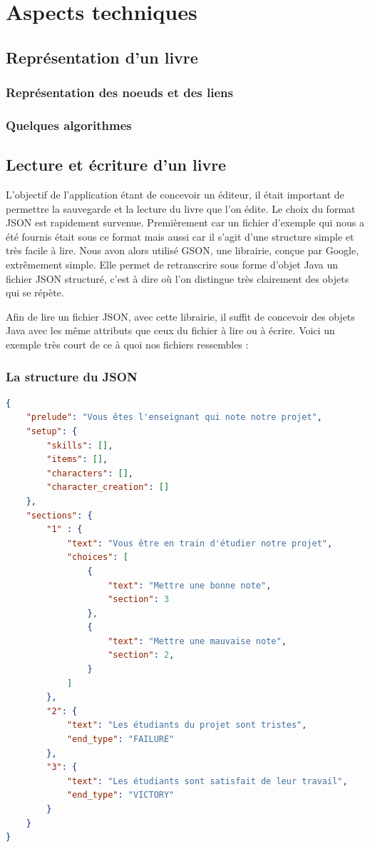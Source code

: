 \chapter{Aspects techniques}

	\section{Représentation d'un livre}
		\label{sec:representation_livre}

		\subsection{Représentation des noeuds et des liens}



		\subsection{Quelques algorithmes}



	\section{Lecture et écriture d'un livre}

		L'objectif de l'application étant de concevoir un éditeur, il était important de permettre la sauvegarde et la lecture du livre que l'on édite. Le choix du format JSON est rapidement survenue. Premièrement car un fichier d'exemple qui nous a été fournis était sous ce format mais aussi car il s'agit d'une structure simple et très facile à lire. Nous avon alors utilisé GSON, une librairie, conçue par Google, extrêmement simple. Elle permet de retranscrire sous forme d'objet Java un fichier JSON structuré, c'est à dire où l'on distingue très clairement des objets qui se répète.

		Afin de lire un fichier JSON, avec cette librairie, il suffit de concevoir des objets Java avec les même attributs que ceux du fichier à lire ou à écrire. Voici un exemple très court de ce à quoi nos fichiers ressembles :

		\subsection{La structure du JSON}

\begin{lstlisting}[language=json, caption=Exemple de livre très simple]
{
	"prelude": "Vous êtes l'enseignant qui note notre projet",
	"setup": {
		"skills": [],
		"items": [],
		"characters": [],
		"character_creation": []
	},
	"sections": {
		"1" : {
			"text": "Vous être en train d'étudier notre projet",
			"choices": [
				{
					"text": "Mettre une bonne note",
					"section": 3
				},
				{
					"text": "Mettre une mauvaise note",
					"section": 2,
				}
			]
		},
		"2": {
			"text": "Les étudiants du projet sont tristes",
			"end_type": "FAILURE"
		},
		"3": {
			"text": "Les étudiants sont satisfait de leur travail",
			"end_type": "VICTORY"
		}
	}
}
\end{lstlisting}

